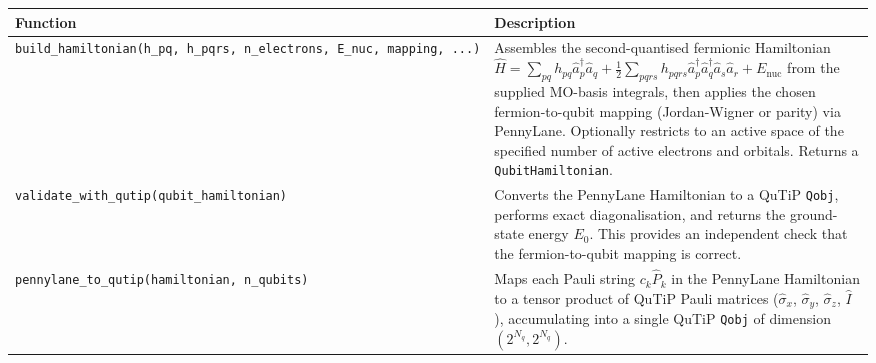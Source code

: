 \documentclass[
  11pt,
]{report}
\newcounter{none} %
\begin{document}
{\def\LTcaptype{none} %
\begin{longtable}[]{@{}
  >{\raggedright\arraybackslash}p{}
  >{\raggedright\arraybackslash}p{}@{}}
\toprule\noalign{}
\begin{minipage}[b]{\linewidth}\raggedright
Function
\end{minipage} & \begin{minipage}[b]{\linewidth}\raggedright
Description
\end{minipage} \\
\midrule\noalign{}
\endhead
\bottomrule\noalign{}
\endlastfoot
\texttt{build\_hamiltonian(h\_pq,\ h\_pqrs,\ n\_electrons,\ E\_nuc,\ mapping,\ ...)}
& Assembles the second-quantised fermionic Hamiltonian
\(\hat{H} = \sum_{pq}h_{pq}\hat{a}_p^\dagger\hat{a}_q + \tfrac{1}{2}\sum_{pqrs}h_{pqrs}\hat{a}_p^\dagger\hat{a}_q^\dagger\hat{a}_s\hat{a}_r + E_{\text{nuc}}\)
from the supplied MO-basis integrals, then applies the chosen
fermion-to-qubit mapping (Jordan-Wigner or parity) via PennyLane.
Optionally restricts to an active space of the specified number of
active electrons and orbitals. Returns a \texttt{QubitHamiltonian}. \\
\texttt{validate\_with\_qutip(qubit\_hamiltonian)} & Converts the
PennyLane Hamiltonian to a QuTiP \texttt{Qobj}, performs exact
diagonalisation, and returns the ground-state energy \(E_0\). This
provides an independent check that the fermion-to-qubit mapping is
correct. \\
\texttt{pennylane\_to\_qutip(hamiltonian,\ n\_qubits)} & Maps each Pauli
string \(c_k \hat{P}_k\) in the PennyLane Hamiltonian to a tensor
product of QuTiP Pauli matrices (\(\hat{\sigma}_x\), \(\hat{\sigma}_y\),
\(\hat{\sigma}_z\), \(\hat{I}\)), accumulating into a single QuTiP
\texttt{Qobj} of dimension \((2^{N_q}, 2^{N_q})\). \\
\end{longtable}
}
\end{document}
